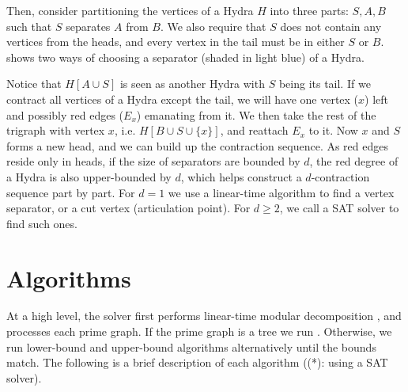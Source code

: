 \documentclass[a4paper,UKenglish,cleveref, autoref, thm-restate]{lipics-v2021}
\begin{document}
Then, consider partitioning the vertices of a Hydra $H$ into three parts:
$S, A, B$ such that $S$ separates $A$ from $B$.
%
We also require that $S$ does not contain any vertices from the heads,
and every vertex in the tail must be in either $S$ or $B$.
%
 shows two ways of choosing a separator (shaded in light blue)
of a Hydra.

Notice that $H[A \cup S]$ is seen as another Hydra with $S$ being its tail.
If we contract all vertices of a Hydra except the tail,
we will have one vertex ($x$) left and possibly red edges ($E_x$) emanating from it.
%
We then take the rest of the trigraph with vertex $x$, i.e. $H[B \cup S \cup \{x\}]$,
and reattach $E_x$ to it.
Now $x$ and $S$ forms a new head, and we can build up the contraction sequence.
%
As red edges reside only in heads,
if the size of separators are bounded by $d$,
the red degree of a Hydra is also upper-bounded by $d$,
which helps construct a $d$-contraction sequence part by part.
%
For $d=1$ we use a linear-time algorithm to find a vertex separator,
or a cut vertex (articulation point).
For $d \geq 2$, we call a SAT solver to find such ones.

\section{Algorithms}

At a high level, the solver first performs linear-time modular decomposition \cite{tedder_simple_2008},
and processes each prime graph.
%
If the prime graph is a tree
we run \primetreesolver.
%
Otherwise, we run lower-bound and upper-bound algorithms alternatively
until the bounds match.
%
The following is a brief description of each algorithm ((*): using a SAT solver).
\end{document}
